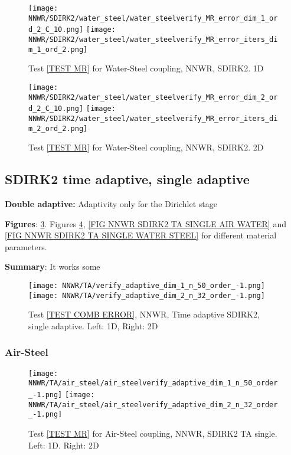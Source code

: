 \documentclass[a4paper,10pt]{article}
\begin{document}
\begin{figure}[!ht]
\texttt{[image: NNWR/SDIRK2/water\_steel/water\_steelverify\_MR\_error\_dim\_1\_ord\_2\_C\_10.png]}
\texttt{[image: NNWR/SDIRK2/water\_steel/water\_steelverify\_MR\_error\_iters\_dim\_1\_ord\_2.png]}
\caption{Test \ref{TEST MR} for Water-Steel coupling, NNWR, SDIRK2. 1D}
\label{FIG NNWR SDIRK2 WATER STEEL 1D}
\end{figure}

\begin{figure}[!ht]
\texttt{[image: NNWR/SDIRK2/water\_steel/water\_steelverify\_MR\_error\_dim\_2\_ord\_2\_C\_10.png]}
\texttt{[image: NNWR/SDIRK2/water\_steel/water\_steelverify\_MR\_error\_iters\_dim\_2\_ord\_2.png]}
\caption{Test \ref{TEST MR} for Water-Steel coupling, NNWR, SDIRK2. 2D}
\label{FIG NNWR SDIRK2 WATER STEEL 2D}
\end{figure}

\FloatBarrier
\subsection{SDIRK2 time adaptive, single adaptive}\label{SEC NNWR SDIRK2 TA SINGLE}
% 
\textbf{Double adaptive:} Adaptivity only for the Dirichlet stage

\textbf{Figures}: \ref{FIG NNWR SDIRK2 TA SINGLE ERROR}. Figures \ref{FIG NNWR SDIRK2 TA SINGLE AIR STEEL}, \ref{FIG NNWR SDIRK2 TA SINGLE AIR WATER} and \ref{FIG NNWR SDIRK2 TA SINGLE WATER STEEL} for different material parameters.

\textbf{Summary}: It works some

\begin{figure}[!ht]
\texttt{[image: NNWR/TA/verify\_adaptive\_dim\_1\_n\_50\_order\_-1.png]}
\texttt{[image: NNWR/TA/verify\_adaptive\_dim\_2\_n\_32\_order\_-1.png]}
\caption{Test \ref{TEST COMB ERROR}, NNWR, Time adaptive SDIRK2, single adaptive. Left: 1D, Right: 2D}
\label{FIG NNWR SDIRK2 TA SINGLE ERROR}
\end{figure}

\FloatBarrier
\subsubsection{Air-Steel}\label{SEC NNWR TA SINGLE AIR STEEL}
% 

\begin{figure}[!ht]
\texttt{[image: NNWR/TA/air\_steel/air\_steelverify\_adaptive\_dim\_1\_n\_50\_order\_-1.png]}
\texttt{[image: NNWR/TA/air\_steel/air\_steelverify\_adaptive\_dim\_2\_n\_32\_order\_-1.png]}
\caption{Test \ref{TEST MR} for Air-Steel coupling, NNWR, SDIRK2 TA single. Left: 1D. Right: 2D}
\label{FIG NNWR SDIRK2 TA SINGLE AIR STEEL}
\end{figure}
\end{document}
